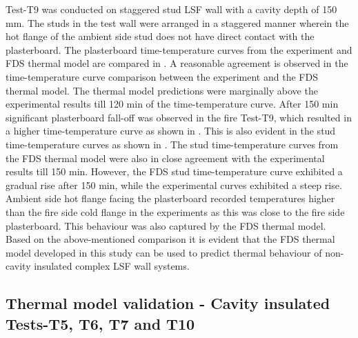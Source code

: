 Test-T9 was conducted on staggered stud LSF wall with a cavity depth of 150 mm. The studs in the test wall were arranged in a staggered manner wherein the hot flange of the ambient side stud does not have direct contact with the plasterboard. The plasterboard time-temperature curves from the experiment and FDS thermal model are compared in . A reasonable agreement is observed in the time-temperature curve comparison between the experiment and the FDS thermal model. The thermal model predictions were marginally above the experimental results till 120 min of the time-temperature curve. After 150 min significant plasterboard fall-off was observed in the fire Test-T9, which resulted in a higher time-temperature curve as shown in . This is also evident in the stud time-temperature curves as shown in . The stud time-temperature curves from the FDS thermal model were also in close agreement with the experimental results till 150 min. However, the FDS stud time-temperature curve exhibited a gradual rise after 150 min, while the experimental curves exhibited a steep rise. Ambient side hot flange facing the plasterboard recorded temperatures higher than the fire side cold flange in the experiments as this was close to the fire side plasterboard. This behaviour was also captured by the FDS thermal model. Based on the above-mentioned comparison it is evident that the FDS thermal model developed in this study can be used to predict thermal behaviour of non-cavity insulated complex LSF wall systems. 

\subsection{Thermal model validation - Cavity insulated Tests-T5, T6, T7 and T10}\label{sec:fds-cavity-models}

